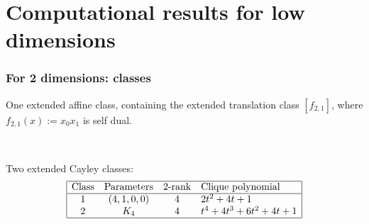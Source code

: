 \documentclass[pdf,sprung,slideColor,nocolorBG]{beamer}
\newenvironment{colortheme}[1]{
\def\ProvidesPackageRCS $##1${\relax}
\renewcommand{\ProcessOptions}{\relax}
\makeatletter

\makeatother
}{}
\begin{document}
\section{Computational results for low dimensions}
\begin{colortheme}{jubata}
\begin{frame}
\frametitle{For 2 dimensions: classes}

One extended affine class, containing the extended translation class $[f_{2,1}]$,
where $f_{2,1}(x) := x_0 x_1$ is self dual.

~

Two extended Cayley classes:
\begin{align*}
\begin{array}{|cccl|}
\hline
\text{Class} &
\text{Parameters} &
\text{2-rank} &
\text{Clique polynomial}
\\
\hline
1 &
(4, 1, 0, 0) & 4 &
2t^{2} + 4t + 1
\\
2 &
K_4 & 4 &
t^{4} + 4t^{3} + 6t^{2} + 4t + 1
\\
\hline
\end{array}
\end{align*}


\end{frame}
\end{colortheme}
\end{document}
